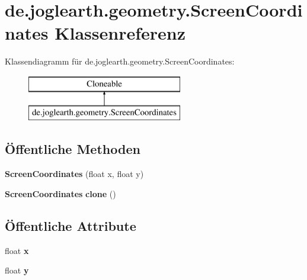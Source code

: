 \section{de.\-joglearth.\-geometry.\-Screen\-Coordinates Klassenreferenz}
\label{classde_1_1joglearth_1_1geometry_1_1_screen_coordinates}
Klassendiagramm für de.\-joglearth.\-geometry.\-Screen\-Coordinates\-:\begin{figure}[H]
\begin{center}
\leavevmode
\includegraphics[height=2.000000cm]{classde_1_1joglearth_1_1geometry_1_1_screen_coordinates}
\end{center}
\end{figure}
\subsection*{Öffentliche Methoden}
\begin{DoxyCompactItemize}
\item 
{\bfseries Screen\-Coordinates} (float x, float y)\label{classde_1_1joglearth_1_1geometry_1_1_screen_coordinates_afc87532187738efd163d3e42981c3aaa}

\item 
{\bf Screen\-Coordinates} {\bfseries clone} ()\label{classde_1_1joglearth_1_1geometry_1_1_screen_coordinates_a331deb737a91c46e453ea2ea1639ca0e}

\end{DoxyCompactItemize}
\subsection*{Öffentliche Attribute}
\begin{DoxyCompactItemize}
\item 
float {\bfseries x}\label{classde_1_1joglearth_1_1geometry_1_1_screen_coordinates_ac92e209f6e5cdc4576c2f78084429aed}

\item 
float {\bfseries y}\label{classde_1_1joglearth_1_1geometry_1_1_screen_coordinates_a3916869098772aa49552deae6aa0e1cc}

\end{DoxyCompactItemize}

